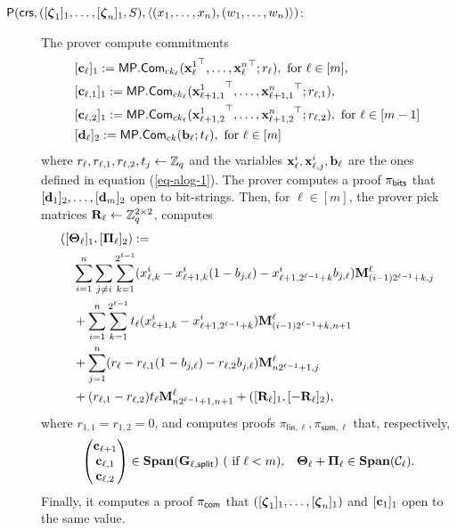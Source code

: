 \begin{description}
\item[{\(\mathsf{P}(\mathsf{crs}, ([{\boldsymbol \zeta}_1]_1, \ldots, [{\boldsymbol \zeta}_n]_1,S), \langle (x_1,\ldots,x_n),(w_1,\ldots,w_n) \rangle)\)}:]
The prover compute commitments
\begin{align*}
&[\mathbf{c}_\ell]_1:=\mathsf{MP}.\mathsf{Com}_{ck_\ell}({\mathbf{x}_\ell^1}^\top,\ldots,{\mathbf{x}_\ell^n}^\top;r_\ell), \text{ for } \ell \in [m],\\
&[\mathbf{c}_{\ell,1}]_1:=\mathsf{MP}.\mathsf{Com}_{ck_\ell}({\mathbf{x}^1_{\ell+1,1}}^\top,\ldots,{\mathbf{x}^n_{\ell+1,1}}^\top;r_{\ell,1}),\\
&[\mathbf{c}_{\ell,2}]_1:=\mathsf{MP}.\mathsf{Com}_{ck_\ell}({\mathbf{x}^1_{\ell+1,2}}^\top,\ldots,{\mathbf{x}^n_{\ell+1,2}}^\top;r_{\ell,2}), \text{ for } \ell\in[m-1]\\
&[\mathbf{d}_\ell]_2:=\mathsf{MP}.\mathsf{Com}_{ck}(\mathbf{b}_\ell;t_\ell),\text{ for } \ell\in[m]
\end{align*}
 where \(r_\ell,r_{\ell,1},r_{\ell,2},t_j\gets\mathbb{Z}_q\) and the variables \(\mathbf{x}^i_\ell,\mathbf{x}^i_{\ell,j},\mathbf{b}_\ell\) are the ones defined in equation (\ref{eq-alog-1}). The prover computes a proof \(\pi_{\mathsf{bits}}\) that \([\mathbf{d}_1]_2,\ldots,[\mathbf{d}_m]_2\) open to bit-strings. Then, for \(\ell\in [m]\), the prover pick matrices \(\mathbf{{R}}_\ell\gets\mathbb{Z}_q^{2\times 2}\), computes
\begin{align*}
&([\mathbf{{\Theta}}_\ell]_1,[\mathbf{{\Pi}}_\ell]_2)  := \\
&\quad \sum_{i=1}^n\sum_{j\neq i}\sum_{k=1}^{2^{\ell-1}}(x^i_{\ell,k}-x^i_{\ell+1,k}(1-b_{j,\ell})-x^i_{\ell+1,2^{\ell-1}+k}b_{j,\ell})\mathbf{{M}}_{(i-1)2^{\ell-1}+k,j}^{\ell}\\
&\quad+ \sum_{i=1}^n\sum_{k=1}^{2^{\ell-1}}t_\ell(x^i_{\ell+1,k}-x^i_{\ell+1,2^{\ell-1}+k})\mathbf{{M}}_{(i-1)2^{\ell-1}+k,n+1}^{\ell} \\
&\quad+ \sum_{j=1}^n (r_\ell-r_{\ell,1}(1-b_{j,\ell})-r_{\ell,2}b_{j,\ell})\mathbf{{M}}_{n2^{\ell-1}+1,j}^{\ell} \\
&\quad+(r_{\ell,1}-r_{\ell,2})t_\ell\mathbf{{M}}^{\ell}_{n2^{\ell-1}+1,n+1}+([\mathbf{{R}}_\ell]_1,[-\mathbf{{R}}_\ell]_2),
\end{align*}
where \(r_{1,1}=r_{1,2}=0\), and computes proofs $\pi_{\mathsf{lin},\ell},\pi_{\mathsf{sum},\ell}$ that, respectively,
\begin{align*}
&\begin{pmatrix}
\mathbf{c}_{\ell+1}\\\mathbf{c}_{\ell,1}\\\mathbf{c}_{\ell,2}
\end{pmatrix}\in
\mathbf{Span}(\mathbf{{G}}_{\ell,\mathsf{split}})\ (\text{ if }\ell< m), &\mathbf{{\Theta_\ell}}+\mathbf{{\Pi_\ell}}\in\mathbf{Span}(\mathcal{C}_\ell).
\end{align*}
Finally, it computes a proof \(\pi_{\mathsf{com}}\) that \(([{\boldsymbol \zeta}_1]_1,\ldots,[{\boldsymbol \zeta}_n]_1)\) and \([\mathbf{c}_1]_1\) open to the same value.


\end{description}
